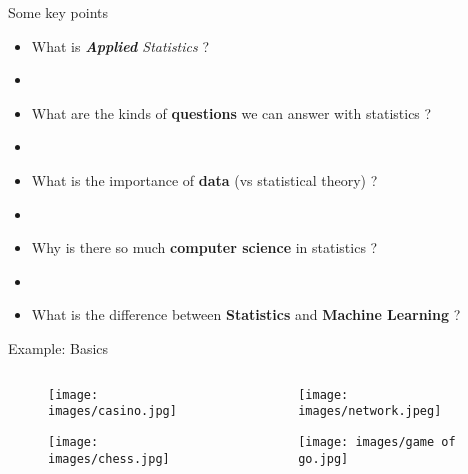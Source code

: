 \documentclass{beamer}
\newcommand{\1}{\mathbf{1}}
\begin{document}
\begin{frame}{Some key points}
  \begin{itemize}
    \item What is \textit{\textbf{Applied} Statistics} ?
    \item[]
    \item What are the kinds of \textbf{questions} we can answer with statistics ?
    \item[]
    \item What is the importance of \textbf{data} (vs statistical theory) ?
    \item[]
    \item Why is there so much \textbf{computer science} in statistics ?
    \item[]
    \item What is the difference between \textbf{Statistics} and \textbf{Machine Learning} ?
  \end{itemize}
\end{frame}

\begin{frame}{Example: Basics}
  \begin{columns}

    \begin{column}{0.5\textwidth}
      \begin{figure}
        \centering
        \texttt{[image: images/casino.jpg]} %
      \end{figure}

      \begin{figure}
        \centering
        \texttt{[image: images/chess.jpg]} %
      \end{figure}
    \end{column}

    \begin{column}{0.5\textwidth}
      \begin{figure}
        \centering
        \texttt{[image: images/network.jpeg]} %
      \end{figure}

      \begin{figure}
        \centering
        \texttt{[image: images/game of go.jpg]} %
      \end{figure}
    \end{column}

  \end{columns}
\end{frame}
\end{document}
